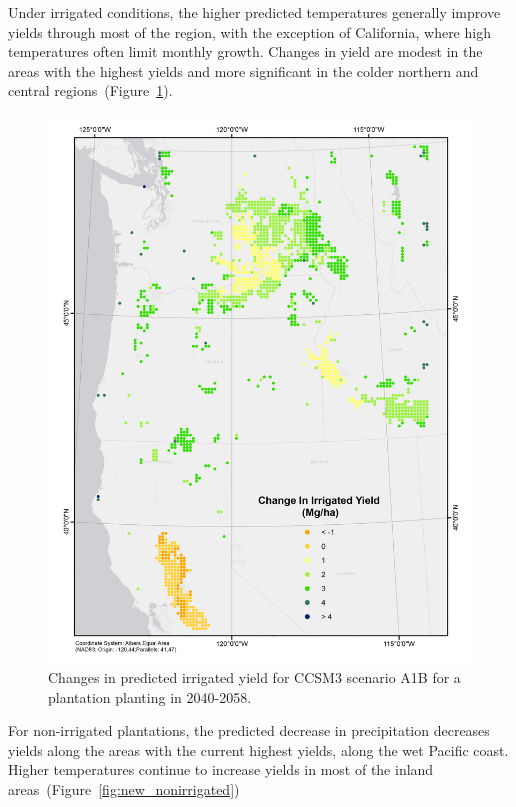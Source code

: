 \documentclass[preprint,review,12pt]{elsarticle}
\begin{document}
Under irrigated conditions, the higher predicted temperatures
generally improve yields through most of the region, with the
exception of California, where high temperatures often limit monthly
growth.  Changes in yield are modest in the areas with the highest
yields and more significant in the colder northern and central
regions~(Figure~\ref{fig:new_irrigated}).
 
\begin{figure}[hp]
  \centering
  \includegraphics[width=1\linewidth]{climate_irrigated}
  \caption{Changes in predicted irrigated yield for \ac{CCSM3} scenario A1B
    for a plantation planting in 2040-2058.}
  \label{fig:new_irrigated}
\end{figure}

For non-irrigated plantations, the predicted decrease in precipitation
decreases yields along the areas with the current highest yields,
along the wet Pacific coast.  Higher temperatures continue to increase
yields in most of the inland areas~(Figure~\ref{fig:new_nonirrigated})
\end{document}
